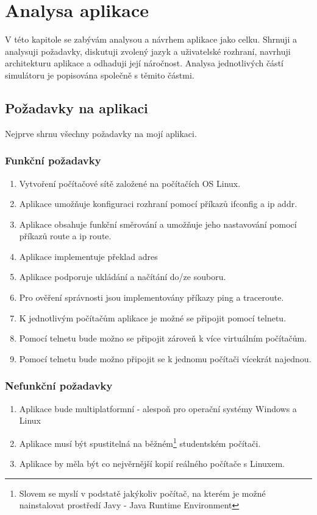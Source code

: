 
\chapter{Analysa aplikace}

V této kapitole se zabývám analysou a návrhem aplikace jako celku. Shrnuji a analysuji požadavky, diskutuji zvolený jazyk a uživatelské rozhraní, navrhuji architekturu aplikace a odhaduji její náročnost. Analysa jednotlivých částí simulátoru je popisována společně s těmito částmi.



\section{Požadavky na aplikaci}

Nejprve shrnu všechny požadavky na mojí aplikaci.

\subsection{Funkční požadavky}
\begin{enumerate}
 \item Vytvoření počítačové sítě založené na počítačích OS Linux.
 \item Aplikace umožňuje konfiguraci rozhraní pomocí příkazů ifconfig a ip addr.
 \item Aplikace obsahuje funkční směrování a umožňuje jeho nastavování pomocí příkazů route a ip route.
 \item Aplikace implementuje překlad adres
 \item Aplikace podporuje ukládání a načítání do/ze souboru.
 \item Pro ověření správnosti jsou implementovány příkazy ping a traceroute.
 \item K jednotlivým počítačům aplikace je možné se připojit pomocí telnetu.
 \item Pomocí telnetu bude možno se připojit zároveň k více virtuálním počítačům.
 \item Pomocí telnetu bude možno připojit se k jednomu počítači vícekrát najednou.
\end{enumerate}

\subsection{Nefunkční požadavky}
\begin{enumerate}
 \item Aplikace bude multiplatformní - alespoň pro operační systémy Windows a Linux
 \item Aplikace musí být spustitelná na běžném\footnote{Slovem  se myslí v podstatě jakýkoliv počítač, na kterém je možné nainstalovat prostředí Javy - Java Runtime Environment} studentském počítači.
 \item Aplikace by měla být co nejvěrnější kopií reálného počítače s Linuxem.
\end{enumerate}



